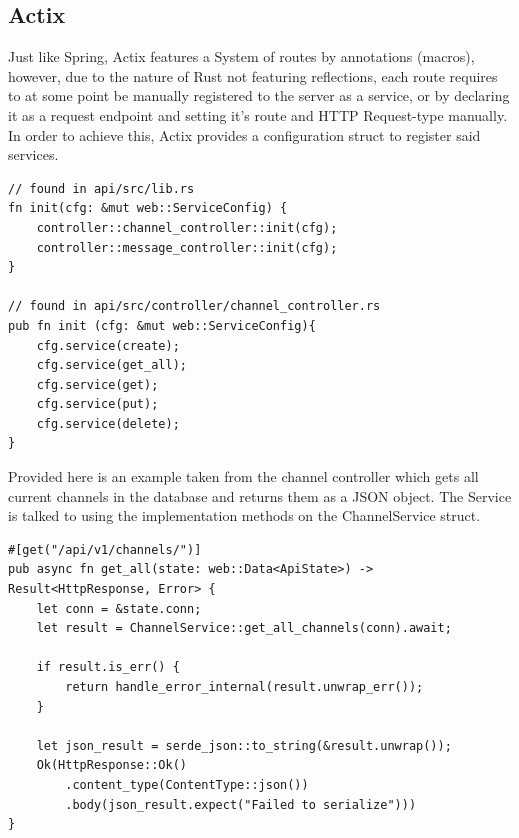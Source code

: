 \documentclass[a4paper,12pt]{article}
\begin{document}
	\subsection{Actix}
	\label{subsec:actix}
	Just like Spring, Actix features a System of routes by annotations (macros), however, due to the nature
	of Rust not featuring reflections, each route requires to at some point be manually registered to the
	server as a service, or by declaring it as a request endpoint and setting it's route and HTTP 
	Request-type manually. In order to achieve this, Actix provides a configuration struct to register
	said services.
	\begin{lstlisting}
// found in api/src/lib.rs
fn init(cfg: &mut web::ServiceConfig) {
    controller::channel_controller::init(cfg);
    controller::message_controller::init(cfg);
}

// found in api/src/controller/channel_controller.rs
pub fn init (cfg: &mut web::ServiceConfig){
    cfg.service(create);
    cfg.service(get_all);
    cfg.service(get);
    cfg.service(put);
    cfg.service(delete);
}
	\end{lstlisting}
	Provided here is an example taken from the channel controller which gets all current channels in
	the database and returns them as a JSON object. The Service is talked to using the implementation
	methods on the ChannelService struct. 
	\begin{lstlisting}
#[get("/api/v1/channels/")]
pub async fn get_all(state: web::Data<ApiState>) -> Result<HttpResponse, Error> {
    let conn = &state.conn;
    let result = ChannelService::get_all_channels(conn).await;
    
    if result.is_err() {
        return handle_error_internal(result.unwrap_err());
    }

    let json_result = serde_json::to_string(&result.unwrap());
    Ok(HttpResponse::Ok()
        .content_type(ContentType::json())
        .body(json_result.expect("Failed to serialize")))
}

	\end{lstlisting}
	
\end{document}
